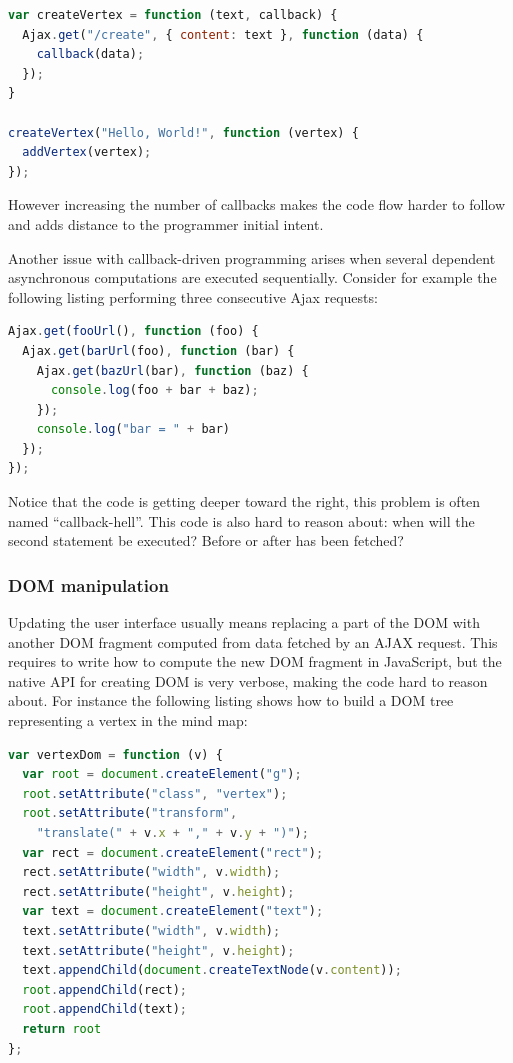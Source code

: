 \documentclass[american,english,runningheads]{llncs}
\begin{document}
\begin{lstlisting}[language=JavaScript,label=async-js]
var createVertex = function (text, callback) {
  Ajax.get("/create", { content: text }, function (data) {
    callback(data);
  });
}

createVertex("Hello, World!", function (vertex) {
  addVertex(vertex);
});
\end{lstlisting}

However increasing the number of callbacks makes the code flow harder to follow and adds distance to the programmer initial intent.

Another issue with callback-driven programming arises when several dependent asynchronous computations are executed sequentially. Consider for example the following listing performing three consecutive Ajax requests:

\begin{lstlisting}[language=JavaScript]
Ajax.get(fooUrl(), function (foo) {
  Ajax.get(barUrl(foo), function (bar) {
    Ajax.get(bazUrl(bar), function (baz) {
      console.log(foo + bar + baz);
    });
    console.log("bar = " + bar)
  });
});
\end{lstlisting}

Notice that the code is getting deeper toward the right, this problem is often named “callback-hell”. This code is also hard to reason about: when will the second  statement be executed? Before or after  has been fetched?

\subsubsection{DOM manipulation}
\label{forest}

Updating the user interface usually means replacing a part of the DOM with another DOM fragment computed from data fetched by an AJAX request. This requires to write how to compute the new DOM fragment in JavaScript, but the native API for creating DOM is very verbose, making the code hard to reason about. For instance the following listing shows how to build a DOM tree representing a vertex in the mind map:

\begin{lstlisting}[language=JavaScript,label=dom-api,caption=DOM fragment creation using the native API]
var vertexDom = function (v) {
  var root = document.createElement("g");
  root.setAttribute("class", "vertex");
  root.setAttribute("transform",
    "translate(" + v.x + "," + v.y + ")");
  var rect = document.createElement("rect");
  rect.setAttribute("width", v.width);
  rect.setAttribute("height", v.height);
  var text = document.createElement("text");
  text.setAttribute("width", v.width);
  text.setAttribute("height", v.height);
  text.appendChild(document.createTextNode(v.content));
  root.appendChild(rect);
  root.appendChild(text);
  return root
};
\end{lstlisting}
\end{document}
